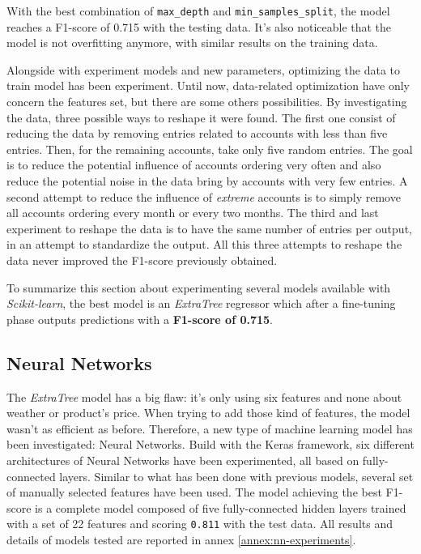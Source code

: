 With the best combination of \texttt{max\_depth} and \texttt{min\_samples\_split}, the model reaches a F1-score of 0.715 with the testing data. It's also noticeable that the model is not overfitting anymore, with similar results on the training data.


Alongside with experiment models and new parameters, optimizing the data to train model has been experiment. Until now, data-related optimization have only concern the features set, but there are some others possibilities. By investigating the data, three possible ways to reshape it were found. 
The first one consist of reducing the data by removing entries related to accounts with less than five entries. Then, for the remaining accounts, take only five random entries. The goal is to reduce the potential influence of accounts ordering very often and also reduce the potential noise in the data bring by accounts with very few entries. A second attempt to reduce the influence of \textit{extreme} accounts is to simply remove all accounts ordering every month or every two months. The third and last experiment to reshape the data is to have the same number of entries per output, in an attempt to standardize the output. All this three attempts to reshape the data never improved the F1-score previously obtained.

To summarize this section about experimenting several models available with \textit{Scikit-learn}, the best model is an \textit{ExtraTree} regressor which after a fine-tuning phase outputs predictions with a \textbf{F1-score of 0.715}.

\subsection{Neural Networks}
The \textit{ExtraTree} model has a big flaw: it's only using six features and none about weather or product's price. When trying to add those kind of features, the model wasn't as efficient as before. Therefore, a new type of machine learning model has been investigated: Neural Networks. Build with the Keras framework, six different architectures of Neural Networks have been experimented, all based on fully-connected layers. Similar to what has been done with previous models, several set of manually selected features have been used. The model achieving the best F1-score is a complete model composed of five fully-connected hidden layers trained with a set of 22 features and scoring \texttt{0.811} with the test data. All results and details of models tested are reported in annex \ref{annex:nn-experiments}.

